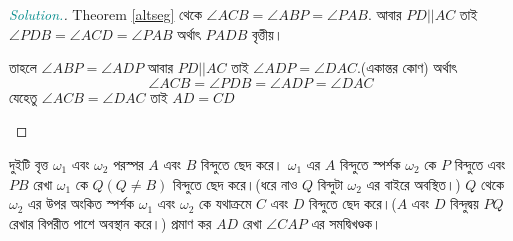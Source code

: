 \documentclass[a4paper,11pt]{article}
\newenvironment{sltn}{\begin{proof}[\emph{\textcolor{darkcyan}{Solution.}}]} {\end{proof}}
\begin{document}
\begin{sltn} Theorem \ref{altseg} থেকে $\angle ACB=\angle ABP=\angle PAB$. আবার $PD||AC$ তাই $\angle PDB=\angle ACD=\angle PAB$ অর্থাৎ $PADB$ বৃত্তীয়।
	
	তাহলে $\angle ABP=\angle ADP$ আবার $PD||AC$ তাই $\angle ADP=\angle DAC$.(একান্তর কোণ) অর্থাৎ 
	\[\angle ACB=\angle PDB=\angle ADP=\angle DAC\]
	যেহেতু $\angle ACB=\angle DAC$ তাই $AD=CD$
	\begin{center}
	\end{center}
\end{sltn}
\begin{xmpl}
	দুইটি বৃত্ত $\omega_1$ এবং $\omega_2$ পরস্পর $A$ এবং $B$ বিন্দুতে ছেদ করে। $\omega_1$ এর $A$ বিন্দুতে স্পর্শক $\omega_2$ কে $P$ বিন্দুতে এবং $PB$ রেখা $\omega_1$ কে $Q(Q\neq B)$ বিন্দুতে ছেদ করে।(ধরে নাও $Q$ বিন্দুটা $\omega_2$ এর বাইরে অবস্থিত।) $Q$ থেকে $\omega_2$ এর উপর অংকিত স্পর্শক $\omega_1$ এবং $\omega_2$ কে যথাক্রমে $C$ এবং $D$ বিন্দুতে ছেদ করে।($A$ এবং $D$ বিন্দুদ্বয় $PQ$ রেখার বিপরীত পাশে অবস্থান করে।) প্রমাণ কর $AD$ রেখা $\angle CAP$ এর সমদ্বিখণ্ডক।
\end{xmpl}
\end{document}
